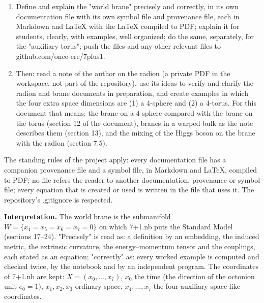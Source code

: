 \documentclass[10pt,a4paper]{article}
\begin{document}
\begin{enumerate}
\item Define and explain the "world brane" precisely and correctly, in its own documentation file with its own symbol file and provenance file, each in Markdown and LaTeX with the LaTeX compiled to PDF; explain it for students, clearly, with examples, well organized; do the same, separately, for the "auxiliary torus"; push the files and any other relevant files to github.com/once-ere/7plus1.
\item Then: read a note of the author on the radion (a private PDF in the workspace, not part of the repository), use its ideas to verify and clarify the radion and brane documents in preparation, and create examples in which the four extra space dimensions are (1) a 4-sphere and (2) a 4-torus. For this document that means: the brane on a 4-sphere compared with the brane on the torus (section 12 of the document), branes in a warped bulk as the note describes them (section 13), and the mixing of the Higgs boson on the brane with the radion (section 7.5).
\end{enumerate}
The standing rules of the project apply: every documentation file has a companion provenance file and a symbol file, in Markdown and LaTeX, compiled to PDF; no file refers the reader to another documentation, provenance or symbol file; every equation that is created or used is written in the file that uses it. The repository’s .gitignore is respected.

\textbf{Interpretation.} The world brane is the submanifold $W=\{x_4=x_5=x_6=x_7=0\}$ on which 7+1.nb puts the Standard Model (sections 17–24). "Precisely" is read as: a definition by an embedding, the induced metric, the extrinsic curvature, the energy–momentum tensor and the couplings, each stated as an equation; "correctly" as: every worked example is computed and checked twice, by the notebook and by an independent program. The coordinates of 7+1.nb are kept: $X=(x_0,\dots,x_7)$, $x_0$ the time (the direction of the octonion unit $e_0=1$), $x_1,x_2,x_3$ ordinary space, $x_4,\dots,x_7$ the four auxiliary space-like coordinates.
\end{document}

